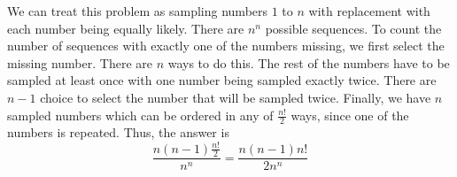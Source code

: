 We can treat this problem as sampling numbers $1$ to $n$ with replacement with each number being equally likely. There are $n^{n}$ possible sequences. To count the number of sequences with exactly one of the numbers missing, we first select the missing number. There are $n$ ways to do this. The rest of the numbers have to be sampled at least once with one number being sampled exactly twice. There are $n-1$ choice to select the number that will be sampled twice. Finally, we have $n$ sampled numbers which can be ordered in any of $\frac{n!}{2}$ ways, since one of the numbers is repeated. Thus, the answer is
$$\frac{n(n-1)\frac{n!}{2}}{n^{n}} = \frac{n(n-1)n!}{2n^{n}}$$